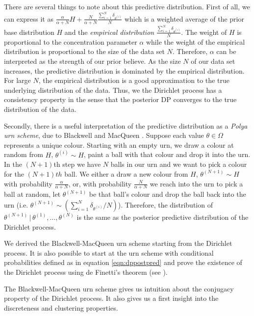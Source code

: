 \documentclass[final,3p,times,twocolumn]{elsarticle}
\begin{document}
There are several things to note about this predictive distribution.
First of all, we can express it as $\frac{\alpha}{\alpha+N}H + \frac{N}{\alpha+N}\frac{\sum_{i=1}^N \delta_{\theta^{(i)}}}{N}$ which is a weighted average of the prior base distribution $H$ and the \emph{empirical distribution} $\frac{\sum_{i=1}^N \delta_{\theta^{(i)}}}{N}$.
The weight of $H$ is proportional to the concentration parameter $\alpha$ while the weight of the empirical distribution is proportional to the size of the data set $N$.
Therefore, $\alpha$ can be interpreted as the strength of our prior believe.
As the size $N$ of our data set increases, the predictive distribution is dominated by the empirical distribution.
For large $N$, the empirical distribution is a good approximation to the true underlying distribution of the data. 
Thus, we the Dirichlet process has a consistency property in the sense that the posterior DP converges to the true distribution of the data.

Secondly, there is a useful interpretation of the predictive distribution as a \emph{Polya urn scheme}, due to Blackwell and MacQueen \cite{blackwell1973}.
Suppose each value $\theta \in \Omega$ represents a unique colour.
Starting with an empty urn, we draw a colour at random from $H$, $\theta^{(i)} \sim H$, paint a ball with that colour and drop it into the urn.
In the $(N+1)$th step we have $N$ balls in our urn and we want to pick a colour for the $(N+1)th$ ball.
We either a draw a new colour from $H$, $\theta^{(N+1)} \sim H$ with probability $\frac{\alpha}{\alpha+N}$, or, with probability $\frac{N}{\alpha+N}$ we reach into the urn to pick a ball at random, let $\theta^{(N+1)}$ be that ball's colour and drop the ball back into the urn (i.e. $\theta^{(N+1)}\sim (\sum_{i=1}^N \delta_{\theta^{(i)}}/N)$). 
Therefore, the distribution of $\theta^{(N+1)} \,|\,\theta^{(1)},\dots,\theta^{(N)}$ is the same as the posterior predictive distribution of the Dirichlet process.

We derived the Blackwell-MacQueen urn scheme starting from the Dirichlet process. 
It is also possible to start at the urn scheme with conditional probabilities defined as in equation \ref{eqn:dppostpred} and prove the existence of the Dirichlet process using de Finetti's theorem (see \cite{blackwell1973}).

The Blackwell-MacQueen urn scheme gives us intuition about the conjugacy property of the Dirichlet process.
It also gives us a first insight into the discreteness and clustering properties.
\end{document}
